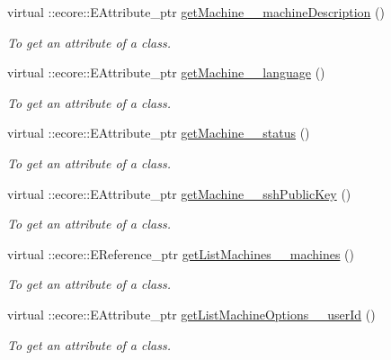 \begin{DoxyCompactItemize}
virtual ::ecore::EAttribute\_\-ptr \hyperlink{classUMS__Data_1_1UMS__DataPackage_a41209de87debe2eaff5f73f29cf70d0b}{getMachine\_\-\_\-machineDescription} ()
\begin{DoxyCompactList}\small\item\em To get an attribute of a class. \item\end{DoxyCompactList}\item 
virtual ::ecore::EAttribute\_\-ptr \hyperlink{classUMS__Data_1_1UMS__DataPackage_a82dd59b4ee2176d64fbc3d26ce33cde1}{getMachine\_\-\_\-language} ()
\begin{DoxyCompactList}\small\item\em To get an attribute of a class. \item\end{DoxyCompactList}\item 
virtual ::ecore::EAttribute\_\-ptr \hyperlink{classUMS__Data_1_1UMS__DataPackage_a8961333785b0de101ec45e5bb3d1d4ea}{getMachine\_\-\_\-status} ()
\begin{DoxyCompactList}\small\item\em To get an attribute of a class. \item\end{DoxyCompactList}\item 
virtual ::ecore::EAttribute\_\-ptr \hyperlink{classUMS__Data_1_1UMS__DataPackage_a0821e7cd71757a7336a10dc7c208fc92}{getMachine\_\-\_\-sshPublicKey} ()
\begin{DoxyCompactList}\small\item\em To get an attribute of a class. \item\end{DoxyCompactList}\item 
virtual ::ecore::EReference\_\-ptr \hyperlink{classUMS__Data_1_1UMS__DataPackage_a226fbfc52c391f7a915e5c3a9448103c}{getListMachines\_\-\_\-machines} ()
\begin{DoxyCompactList}\small\item\em To get an attribute of a class. \item\end{DoxyCompactList}\item 
virtual ::ecore::EAttribute\_\-ptr \hyperlink{classUMS__Data_1_1UMS__DataPackage_a0f50eff1984175d21bc2386948362130}{getListMachineOptions\_\-\_\-userId} ()
\begin{DoxyCompactList}\small\item\em To get an attribute of a class. \item\end{DoxyCompactList}\item 

\end{DoxyCompactItemize}
